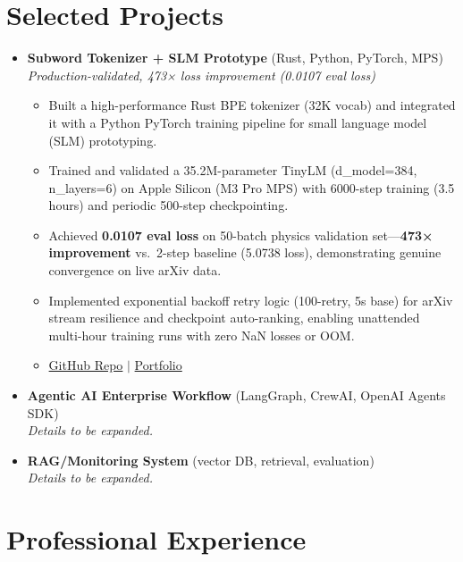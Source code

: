 \documentclass[a4paper,10pt]{article}
\begin{document}
\section{Selected Projects}
\begin{itemize}[leftmargin=0.5cm]
  \item \textbf{Subword Tokenizer + SLM Prototype} (Rust, Python, PyTorch, MPS) \\
  \textit{Production-validated, 473× loss improvement (0.0107 eval loss)}
  \begin{itemize}[leftmargin=0.45cm]
    \item Built a high-performance Rust BPE tokenizer (32K vocab) and integrated it with a Python PyTorch training pipeline for small language model (SLM) prototyping.
    \item Trained and validated a 35.2M-parameter TinyLM (d\_model=384, n\_layers=6) on Apple Silicon (M3 Pro MPS) with 6000-step training (3.5 hours) and periodic 500-step checkpointing.
    \item Achieved \textbf{0.0107 eval loss} on 50-batch physics validation set—\textbf{473× improvement} vs.\ 2-step baseline (5.0738 loss), demonstrating genuine convergence on live arXiv data.
    \item Implemented exponential backoff retry logic (100-retry, 5s base) for arXiv stream resilience and checkpoint auto-ranking, enabling unattended multi-hour training runs with zero NaN losses or OOM.
    \item \href{https://github.com/upcomingtrillioner12-design/subword_tokenizer}{GitHub Repo} $|$ \href{https://github.com/JaydipSingh/portfolio}{Portfolio}
  \end{itemize}
  \item \textbf{Agentic AI Enterprise Workflow} (LangGraph, CrewAI, OpenAI Agents SDK) \\
  \textit{Details to be expanded.}
  \item \textbf{RAG/Monitoring System} (vector DB, retrieval, evaluation) \\
  \textit{Details to be expanded.}
\end{itemize}

\section{Professional Experience}
\end{document}
